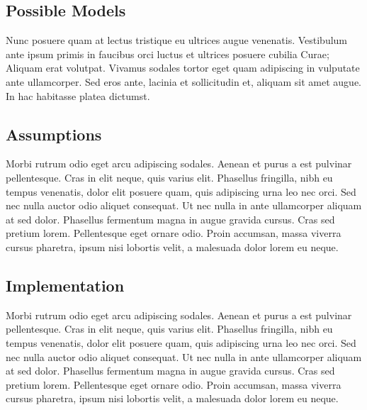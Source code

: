 \subsection{Possible Models}

Nunc posuere quam at lectus tristique eu ultrices augue venenatis. Vestibulum ante ipsum primis in faucibus orci luctus et ultrices posuere cubilia Curae; Aliquam erat volutpat. Vivamus sodales tortor eget quam adipiscing in vulputate ante ullamcorper. Sed eros ante, lacinia et sollicitudin et, aliquam sit amet augue. In hac habitasse platea dictumst.


\subsection{Assumptions}
Morbi rutrum odio eget arcu adipiscing sodales. Aenean et purus a est pulvinar pellentesque. Cras in elit neque, quis varius elit. Phasellus fringilla, nibh eu tempus venenatis, dolor elit posuere quam, quis adipiscing urna leo nec orci. Sed nec nulla auctor odio aliquet consequat. Ut nec nulla in ante ullamcorper aliquam at sed dolor. Phasellus fermentum magna in augue gravida cursus. Cras sed pretium lorem. Pellentesque eget ornare odio. Proin accumsan, massa viverra cursus pharetra, ipsum nisi lobortis velit, a malesuada dolor lorem eu neque.


\subsection{Implementation}
Morbi rutrum odio eget arcu adipiscing sodales. Aenean et purus a est pulvinar pellentesque. Cras in elit neque, quis varius elit. Phasellus fringilla, nibh eu tempus venenatis, dolor elit posuere quam, quis adipiscing urna leo nec orci. Sed nec nulla auctor odio aliquet consequat. Ut nec nulla in ante ullamcorper aliquam at sed dolor. Phasellus fermentum magna in augue gravida cursus. Cras sed pretium lorem. Pellentesque eget ornare odio. Proin accumsan, massa viverra cursus pharetra, ipsum nisi lobortis velit, a malesuada dolor lorem eu neque.


